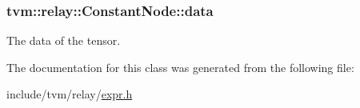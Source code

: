 \subsubsection[{\texorpdfstring{data}{data}}]{ tvm\+::relay\+::\+Constant\+Node\+::data}\hypertarget{classtvm_1_1relay_1_1ConstantNode_ae13d0996e9324caf76cc1fa8d7aa00f9}{}\label{classtvm_1_1relay_1_1ConstantNode_ae13d0996e9324caf76cc1fa8d7aa00f9}


The data of the tensor. 



The documentation for this class was generated from the following file\+:\begin{DoxyCompactItemize}
\item 
include/tvm/relay/\hyperlink{relay_2expr_8h}{expr.\+h}\end{DoxyCompactItemize}
